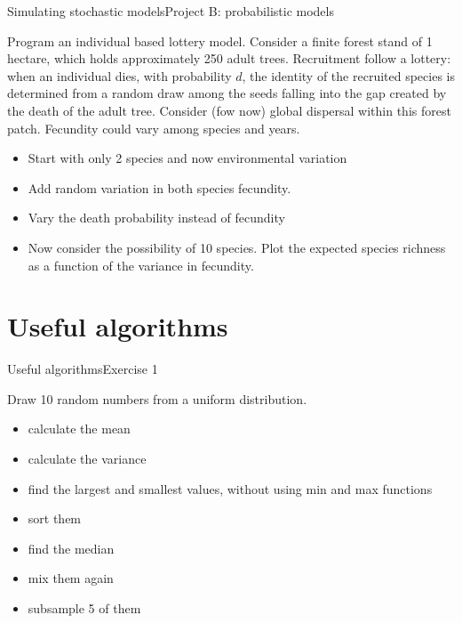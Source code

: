 \documentclass{eecslides}
\begin{document}
	\begin{frame}{Simulating stochastic models}{Project B: probabilistic models}

		Program an individual based lottery model. Consider a finite forest stand of 1 hectare, which holds approximately 250 adult trees. Recruitment follow a lottery: when an individual dies, with probability $d$, the identity of the recruited species is determined from a random draw among the seeds falling into the gap created by the death of the adult tree. Consider (fow now) global dispersal within this forest patch. Fecundity could vary among species and years. 

	\begin{itemize}
		\item Start with only 2 species and now environmental variation
		\item Add random variation in both species fecundity. 
		\item Vary the death probability instead of fecundity
		\item Now consider the possibility of 10 species. Plot the expected species richness as a function of the variance in fecundity.
	\end{itemize}

	\end{frame}


	\section{Useful algorithms}


	\begin{frame}{Useful algorithms}{Exercise 1}

	Draw 10 random numbers from a uniform distribution. \\
	\begin{itemize}
		\item calculate the mean 
		\item calculate the variance
		\item find the largest and smallest values, without using min and max functions
		\item sort them
		\item find the median
		\item mix them again
		\item subsample 5 of them	
	\end{itemize}

	\end{frame}
\end{document}
